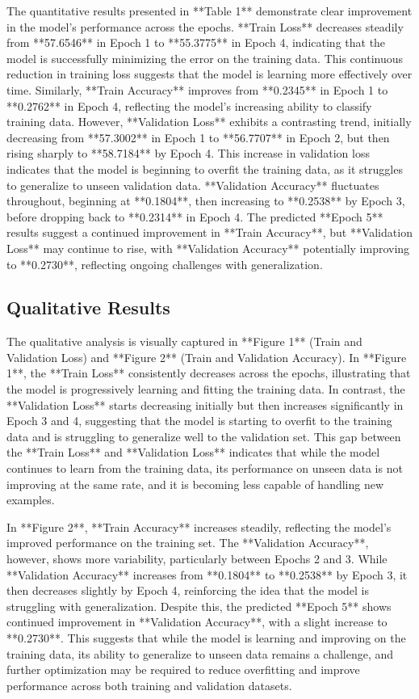 \documentclass{article}
\theoremstyle{plain}
\theoremstyle{definition}
\theoremstyle{remark}
\begin{document}
The quantitative results presented in **Table 1** demonstrate clear improvement in the model's performance across the epochs. **Train Loss** decreases steadily from **57.6546** in Epoch 1 to **55.3775** in Epoch 4, indicating that the model is successfully minimizing the error on the training data. This continuous reduction in training loss suggests that the model is learning more effectively over time. Similarly, **Train Accuracy** improves from **0.2345** in Epoch 1 to **0.2762** in Epoch 4, reflecting the model's increasing ability to classify training data. However, **Validation Loss** exhibits a contrasting trend, initially decreasing from **57.3002** in Epoch 1 to **56.7707** in Epoch 2, but then rising sharply to **58.7184** by Epoch 4. This increase in validation loss indicates that the model is beginning to overfit the training data, as it struggles to generalize to unseen validation data. **Validation Accuracy** fluctuates throughout, beginning at **0.1804**, then increasing to **0.2538** by Epoch 3, before dropping back to **0.2314** in Epoch 4. The predicted **Epoch 5** results suggest a continued improvement in **Train Accuracy**, but **Validation Loss** may continue to rise, with **Validation Accuracy** potentially improving to **0.2730**, reflecting ongoing challenges with generalization. 

\subsection{Qualitative Results}

The qualitative analysis is visually captured in **Figure 1** (Train and Validation Loss) and **Figure 2** (Train and Validation Accuracy). In **Figure 1**, the **Train Loss** consistently decreases across the epochs, illustrating that the model is progressively learning and fitting the training data. In contrast, the **Validation Loss** starts decreasing initially but then increases significantly in Epoch 3 and 4, suggesting that the model is starting to overfit to the training data and is struggling to generalize well to the validation set. This gap between the **Train Loss** and **Validation Loss** indicates that while the model continues to learn from the training data, its performance on unseen data is not improving at the same rate, and it is becoming less capable of handling new examples.

In **Figure 2**, **Train Accuracy** increases steadily, reflecting the model's improved performance on the training set. The **Validation Accuracy**, however, shows more variability, particularly between Epochs 2 and 3. While **Validation Accuracy** increases from **0.1804** to **0.2538** by Epoch 3, it then decreases slightly by Epoch 4, reinforcing the idea that the model is struggling with generalization. Despite this, the predicted **Epoch 5** shows continued improvement in **Validation Accuracy**, with a slight increase to **0.2730**. This suggests that while the model is learning and improving on the training data, its ability to generalize to unseen data remains a challenge, and further optimization may be required to reduce overfitting and improve performance across both training and validation datasets.
\end{document}
